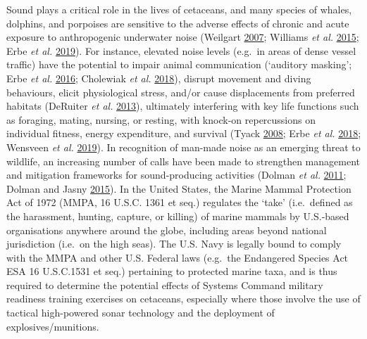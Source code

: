 \documentclass[
]{article}
\begin{document}
Sound plays a critical role in the lives of cetaceans, and many species of whales, dolphins, and porpoises are sensitive to the adverse effects of chronic and acute exposure to anthropogenic underwater noise (Weilgart \protect\hyperlink{ref-Weilgart2007}{2007}; Williams \emph{et al.} \protect\hyperlink{ref-Williams2015}{2015}; Erbe \emph{et al.} \protect\hyperlink{ref-Erbe2019}{2019}). For instance, elevated noise levels (e.g.~in areas of dense vessel traffic) have the potential to impair animal communication (`auditory masking'; Erbe \emph{et al.} \protect\hyperlink{ref-Erbe2016}{2016}; Cholewiak \emph{et al.} \protect\hyperlink{ref-Cholewiak2018}{2018}), disrupt movement and diving behaviours, elicit physiological stress, and/or cause displacements from preferred habitats (DeRuiter \emph{et al.} \protect\hyperlink{ref-DeRuiter2013}{2013}), ultimately interfering with key life functions such as foraging, mating, nursing, or resting, with knock-on repercussions on individual fitness, energy expenditure, and survival (Tyack \protect\hyperlink{ref-Tyack2008}{2008}; Erbe \emph{et al.} \protect\hyperlink{ref-Erbe2018}{2018}; Wensveen \emph{et al.} \protect\hyperlink{ref-Wensveen2019}{2019}). In recognition of man-made noise as an emerging threat to wildlife, an increasing number of calls have been made to strengthen management and mitigation frameworks for sound-producing activities (Dolman \emph{et al.} \protect\hyperlink{ref-Dolman2011}{2011}; Dolman and Jasny \protect\hyperlink{ref-Dolman2015}{2015}). In the United States, the Marine Mammal Protection Act of 1972 (MMPA, 16 U.S.C. 1361 et seq.) regulates the `take' (i.e.~defined as the harassment, hunting, capture, or killing) of marine mammals by U.S.-based organisations anywhere around the globe, including areas beyond national jurisdiction (i.e.~on the high seas). The U.S. Navy is legally bound to comply with the MMPA and other U.S. Federal laws (e.g.~the Endangered Species Act ESA 16 U.S.C.1531 et seq.) pertaining to protected marine taxa, and is thus required to determine the potential effects of Systems Command military readiness training exercises on cetaceans, especially where those involve the use of tactical high-powered sonar technology and the deployment of explosives/munitions.
\end{document}
